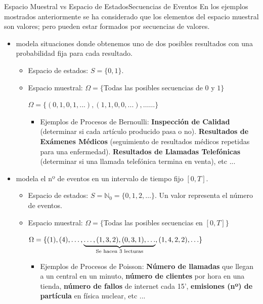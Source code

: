\documentclass[10pt, envcountsect, handout, aspectratio=1610, hyperref={hypertexnames=true}]{beamer}
\begin{document}
\begin{frame}{Espacio Muestral vs Espacio de Estados}{Secuencias de Eventos}
En los ejemplos mostrados anteriormente se ha considerado que los elementos del espacio muestral son valores; pero pueden estar formados por secuencias de valores. 

\begin{examples}

\begin{itemize}
\item{} modela situaciones donde obtenemos uno de dos posibles resultados  con una probabilidad fija para cada resultado.
	\begin{itemize}
	\item Espacio de estados: ${S}=\{0, 1\}$. 
	\item Espacio muestral: $\Omega=\{$Todas las posibles secuencias de $0$ y $1\}$
	
	\unEjemplo $\Omega=\{(0,1,0,1,...),(1,1,0,0,...),… \ldots \}$
	
	\begin{itemize}
	\item \textcolor{ejemplo}{Ejemplos de Procesos de Bernoulli}: \textbf{Inspección de Calidad} (determinar si cada artículo producido pasa o no). \textbf{Resultados de Exámenes Médicos} (seguimiento de resultados médicos repetidas para una enfermedad). \textbf{Resultados de Llamadas Telefónicas} (determinar si una llamada telefónica termina en venta), etc ...
	\end{itemize}
	
	\end{itemize}

	
\item{} modela el nº de eventos en un intervalo de tiempo fijo $[0,T]$.
	\begin{itemize}
	\item Espacio de estados: $S=\mathbb{N}_0=\{0, 1, 2, \ldots\}$. Un valor representa el número de eventos.
	\item Espacio muestral: $\Omega=\{$Todas las posibles secuencias en $[0, T]\}$
	
	\unEjemplo $\Omega=\{(1),(4),\ldots, \underbrace{\ldots, (1, 3, 2), (0, 3, 1), \ldots}_{\mbox{\scriptsize Se hacen 3 lecturas}}, (1, 4, 2, 2), \ldots \}$
	
	\begin{itemize}
	\item \textcolor{ejemplo}{Ejemplos de Procesos de Poisson}: \textbf{Número de llamadas} que llegan a un central en un minuto, \textbf{número de clientes} por hora en una tienda, \textbf{número de fallos} de internet cada 15', \textbf{emisiones (nº) de partícula} en física nuclear,  etc ...
	\end{itemize}
	
	\end{itemize}
	

\end{itemize}

\end{examples}
\end{frame}
\end{document}

